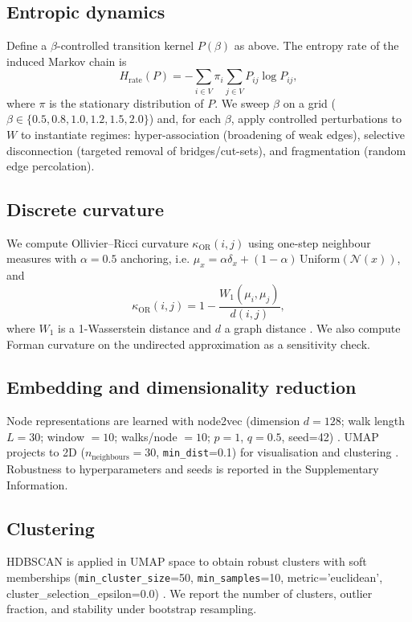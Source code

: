 \documentclass[fleqn,10pt]{wlscirep}
\begin{document}
\subsection*{Entropic dynamics}
Define a $\beta$-controlled transition kernel $P(\beta)$ as above. The entropy rate of the induced Markov chain is
\begin{equation}
H_{\mathrm{rate}}(P) = - \sum_{i\in V} \pi_i \sum_{j\in V} P_{ij} \log P_{ij},
\end{equation}
where $\pi$ is the stationary distribution of $P$. We sweep $\beta$ on a grid ($\beta\in\{0.5,0.8,1.0,1.2,1.5,2.0\}$) and, for each $\beta$, apply controlled perturbations to $W$ to instantiate regimes: hyper-association (broadening of weak edges), selective disconnection (targeted removal of bridges/cut-sets), and fragmentation (random edge percolation).

\subsection*{Discrete curvature}
We compute Ollivier--Ricci curvature $\kappa_{\mathrm{OR}}(i,j)$ using one-step neighbour measures with $\alpha=0.5$ anchoring, i.e. $\mu_x=\alpha\delta_x+(1-\alpha)\,$Uniform$(\mathcal{N}(x))$, and
\begin{equation}
\kappa_{\mathrm{OR}}(i,j) = 1 - \frac{W_1(\mu_i,\mu_j)}{d(i,j)},
\end{equation}
where $W_1$ is a 1-Wasserstein distance and $d$ a graph distance \cite{Ollivier2009,Forman2003}. We also compute Forman curvature on the undirected approximation as a sensitivity check.

\subsection*{Embedding and dimensionality reduction}
Node representations are learned with node2vec (dimension $d=128$; walk length $L=30$; window $=10$; walks/node $=10$; $p=1$, $q=0.5$, seed=42) \cite{Grover2016node2vec}. UMAP projects to 2D ($n_{\mathrm{neighbours}}=30$, \texttt{min\_dist}=0.1) for visualisation and clustering \cite{McInnes2018UMAP}. Robustness to hyperparameters and seeds is reported in the Supplementary Information.

\subsection*{Clustering}
HDBSCAN is applied in UMAP space to obtain robust clusters with soft memberships (\texttt{min\_cluster\_size}=50, \texttt{min\_samples}=10, metric='euclidean', cluster\_selection\_epsilon=0.0) \cite{Campello2015}. We report the number of clusters, outlier fraction, and stability under bootstrap resampling.
\end{document}
